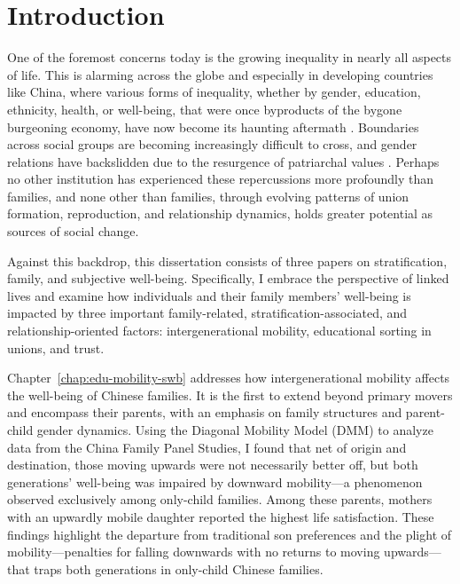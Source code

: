 \chapter{Introduction}
\label{chap:introduction}

One of the foremost concerns today is the growing inequality in nearly all aspects of life. This is alarming across the globe and especially in developing countries like China, where various forms of inequality, whether by gender, education, ethnicity, health, or well-being, that were once byproducts of the bygone burgeoning economy, have now become its haunting aftermath \parencite{sicularUrbanRuralIncomeGap2007,xieIncomeInequalityTodays2014,yeungHigherEducationExpansion2013}. Boundaries across social groups are becoming increasingly difficult to cross, and gender relations have backslidden due to the resurgence of patriarchal values \parencite{jiUnequalCareUnequal2017}. Perhaps no other institution has experienced these repercussions more profoundly than families, and none other than families, through evolving patterns of union formation, reproduction, and relationship dynamics, holds greater potential as sources of social change.

Against this backdrop, this dissertation consists of three papers on stratification, family, and subjective well-being. Specifically, I embrace the perspective of linked lives and examine how individuals and their family members' well-being is impacted by three important family-related, stratification-associated, and relationship-oriented factors: intergenerational mobility, educational sorting in unions, and trust.

Chapter~\ref{chap:edu-mobility-swb} addresses how intergenerational mobility affects the well-being of Chinese families. It is the first to extend beyond primary movers and encompass their parents, with an emphasis on family structures and parent-child gender dynamics. Using the Diagonal Mobility Model (DMM) to analyze data from the China Family Panel Studies, I found that net of origin and destination, those moving upwards were not necessarily better off, but both generations' well-being was impaired by downward mobility—a phenomenon observed exclusively among only-child families. Among these parents, mothers with an upwardly mobile daughter reported the highest life satisfaction. These findings highlight the departure from traditional son preferences and the plight of mobility—penalties for falling downwards with no returns to moving upwards—that traps both generations in only-child Chinese families.

